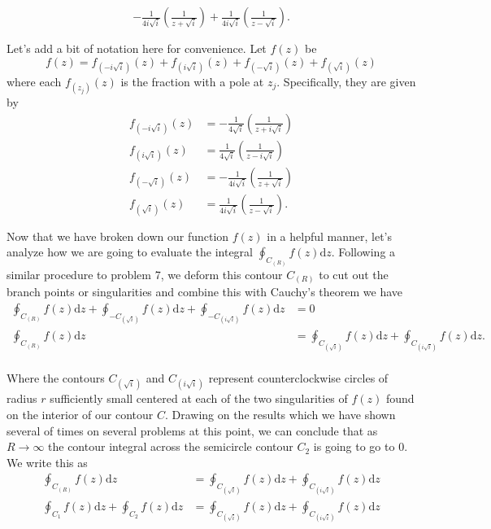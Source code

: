 \documentclass[10pt]{amsart}
\newcommand{\D}{\mathrm{d}}
\theoremstyle{nonumberplain}
\begin{document}
\begin{enumerate}[label={\bf {\arabic*}:}]
\begin{align*}
		- \frac{1}{4i\sqrt{i}} \left( \frac{1}{z + \sqrt{i}} \right)
		+ \frac{1}{4i\sqrt{i}} \left( \frac{1}{z - \sqrt{i}} \right). \\ \\
\end{align*}
Let's add a bit of notation here for convenience. Let $f(z)$ be
$$
f(z) = f_{(-i\sqrt{i})}(z) + f_{(i\sqrt{i})}(z) + f_{(-\sqrt{i})}(z) + f_{(\sqrt{i})}(z)
$$
where each $f_{(z_j)}(z)$ is the fraction with a pole at $z_j$. Specifically, they are given by
\begin{align*}
f_{(-i\sqrt{i})}(z) &= - \frac{1}{4\sqrt{i}} \left( \frac{1}{z + i\sqrt{i}}\right) \\
f_{(i\sqrt{i})}(z) &= \frac{1}{4\sqrt{i}} \left(\frac{1}{z - i\sqrt{i}} \right) \\
f_{(-\sqrt{i})}(z) &= - \frac{1}{4i\sqrt{i}} \left( \frac{1}{z + \sqrt{i}} \right) \\
f_{(\sqrt{i})}(z) &= \frac{1}{4i\sqrt{i}} \left( \frac{1}{z - \sqrt{i}} \right). \\ \\
\end{align*}
Now that we have broken down our function $f(z)$ in a helpful manner, let's analyze how we are going to evaluate the integral $\oint_{C_{(R)}} f(z) \D z$.
Following a similar procedure to problem 7, we deform this contour $C_{(R)}$ to cut out the branch points or singularities and combine this with Cauchy's theorem we have
\begin{align*}
\oint_{C_{(R)}} f(z) \D z + \oint_{-C_{(\sqrt{i})}} f(z) \D z + \oint_{-C_{(i\sqrt{i})}} f(z) \D z &= 0 \\
\oint_{C_{(R)}} f(z) \D z &= \oint_{C_{(\sqrt{i})}} f(z) \D z + \oint_{C_{(i\sqrt{i})}} f(z) \D z.
\end{align*}
\\
Where the contours $C_{(\sqrt{i})}$ and $C_{(i\sqrt{i})}$ represent counterclockwise circles of radius $r$ sufficiently small centered at each of the two singularities of $f(z)$ found on the interior of our contour $C$.
Drawing on the results which we have shown several of times on several problems at this point, we can conclude that as $R\rightarrow \infty$ the contour integral across the semicircle contour $C_2$ is going to go to 0.
We write this as
\begin{align*}
\oint_{C_{(R)}} f(z) \D z &= \oint_{C_{(\sqrt{i})}} f(z) \D z + \oint_{C_{(i\sqrt{i})}} f(z) \D z \\
\oint_{C_1} f(z) \D z + \oint_{C_2} f(z) \D z &= \oint_{C_{(\sqrt{i})}} f(z) \D z + \oint_{C_{(i\sqrt{i})}} f(z) \D z \\

\end{align*}
\end{enumerate}
\end{document}
